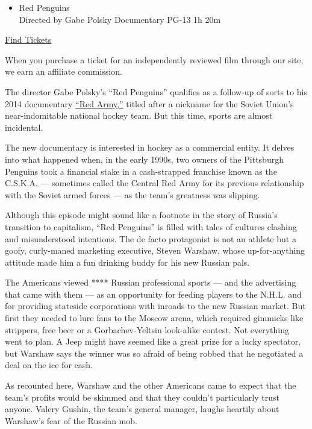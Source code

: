\begin{itemize}
\tightlist
\item
  Red Penguins\\
  Directed by Gabe Polsky Documentary PG-13 1h 20m
\end{itemize}

\href{https://www.imdb.com/showtimes/title/tt10779084?ref_=ref_ext_NYT}{Find
Tickets}

When you purchase a ticket for an independently reviewed film through
our site, we earn an affiliate commission.

The director Gabe Polsky's ``Red Penguins'' qualifies as a follow-up of
sorts to his 2014 documentary
\href{https://www.nytimes.com/2014/11/14/movies/red-army-the-rise-and-fall-of-a-soviet-hockey-dynasty.html}{``Red
Army,''} titled after a nickname for the Soviet Union's near-indomitable
national hockey team. But this time, sports are almost incidental.

The new documentary is interested in hockey as a commercial entity. It
delves into what happened when, in the early 1990s, two owners of the
Pittsburgh Penguins took a financial stake in a cash-strapped franchise
known as the C.S.K.A. --- sometimes called the Central Red Army for its
previous relationship with the Soviet armed forces --- as the team's
greatness was slipping.

Although this episode might sound like a footnote in the story of
Russia's transition to capitalism, ``Red Penguins'' is filled with tales
of cultures clashing and misunderstood intentions. The de facto
protagonist is not an athlete but a goofy, curly-maned marketing
executive, Steven Warshaw, whose up-for-anything attitude made him a fun
drinking buddy for his new Russian pals.

The Americans viewed **** Russian professional sports --- and the
advertising that came with them --- as an opportunity for feeding
players to the N.H.L. and for providing stateside corporations with
inroads to the new Russian market. But first they needed to lure fans to
the Moscow arena, which required gimmicks like strippers, free beer or a
Gorbachev-Yeltsin look-alike contest. Not everything went to plan. A
Jeep might have seemed like a great prize for a lucky spectator, but
Warshaw says the winner was so afraid of being robbed that he negotiated
a deal on the ice for cash.

As recounted here, Warshaw and the other Americans came to expect that
the team's profits would be skimmed and that they couldn't particularly
trust anyone. Valery Gushin, the team's general manager, laughs heartily
about Warshaw's fear of the Russian mob.

